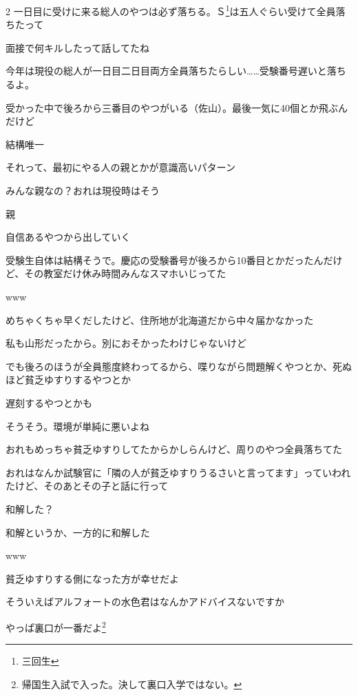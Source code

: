 \begin{multicols}{2}
 一日目に受けに来る総人のやつは必ず落ちる。Ｓ\footnote{三回生}は五人ぐらい受けて全員落ちたって

 面接で何キルしたって話してたね

 今年は現役の総人が一日目二日目両方全員落ちたらしい……受験番号遅いと落ちるよ。

 受かった中で後ろから三番目のやつがいる（佐山）。最後一気に40個とか飛ぶんだけど

 結構唯一

 それって、最初にやる人の親とかが意識高いパターン

 みんな親なの？おれは現役時はそう

 親

 自信あるやつから出していく

 受験生自体は結構そうで。慶応の受験番号が後ろから10番目とかだったんだけど、その教室だけ休み時間みんなスマホいじってた

 www

 めちゃくちゃ早くだしたけど、住所地が北海道だから中々届かなかった

 私も山形だったから。別におそかったわけじゃないけど

 でも後ろのほうが全員態度終わってるから、喋りながら問題解くやつとか、死ぬほど貧乏ゆすりするやつとか

 遅刻するやつとかも

 そうそう。環境が単純に悪いよね

 おれもめっちゃ貧乏ゆすりしてたからかしらんけど、周りのやつ全員落ちてた

 おれはなんか試験官に「隣の人が貧乏ゆすりうるさいと言ってます」っていわれたけど、そのあとその子と話に行って

 和解した？

 和解というか、一方的に和解した

 www

 貧乏ゆすりする側になった方が幸せだよ

 そういえばアルフォートの水色君はなんかアドバイスないですか

 やっぱ裏口が一番だよ\footnote{帰国生入試で入った。決して裏口入学ではない。}


\end{multicols}

